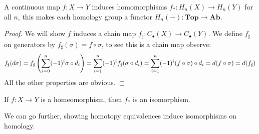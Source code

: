 \documentclass{article}
\begin{document}
\begin{proposition}
    A continuous map $f:X\rightarrow Y$ induces homomorphisms $f_*:H_n(X)\rightarrow H_n(Y)$ for all $n$, this makes each homology group a functor $H_n(-):\textbf{Top}\rightarrow\textbf{Ab}$.
    \begin{proof}
        We will show $f$ induces a chain map $f_\sharp:C_\bullet(X)\rightarrow C_\bullet(Y)$. We define $f_\sharp$ on generators by $f_\sharp(\sigma)=f\circ\sigma$, to see this is a chain map observe: \[
            f_\sharp(d\sigma) = f_\sharp\left( \sum_{i=0}^n(-1)^i\sigma\circ d_i \right) = \sum_{i=1}^n(-1)^if_\sharp(\sigma\circ d_i) = \sum_{i=1}^n(-1)^i(f\circ\sigma)\circ d_i= d(f\circ\sigma) = d(f_\sharp)
        \] All the other properties are obvious.
    \end{proof}
\end{proposition}

\begin{corollary}
    If $f:X\rightarrow Y$ is a homeomorphism, then $f_*$ is an isomorphism.
\end{corollary}

We can go further, showing homotopy equivalences induce isomorphisms on homology.
\end{document}
